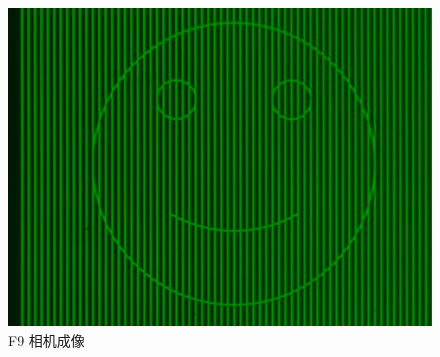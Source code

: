 \documentclass{ctexart}
\begin{document}
\begin{figure}[H]
\begin{minipage}[b]{0.3\textwidth}
    \includegraphics[width=\textwidth]{pictures/F9-nomask.png}
    \caption{F9 相机成像}
  \end{minipage}
\end{figure}
\end{document}
